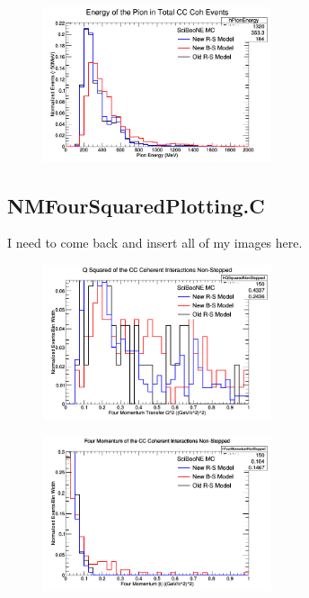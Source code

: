\documentclass[11pt]{article}
\begin{document}
\begin{figure}[H]
\centering
\includegraphics[width=0.6\textwidth]{NMPionPlottingImages/12-NMPionPlotting.png}
\caption{}
\end{figure}

\subsection{NMFourSquaredPlotting.C}
I need to come back and insert all of my images here.

\begin{figure}[H]
\centering
\includegraphics[width=0.6\textwidth]{NMFourSquaredPlottingImages/1-NMFourSquaredPlotting.png}
\caption{}
\end{figure}

\begin{figure}[H]
\centering
\includegraphics[width=0.6\textwidth]{NMFourSquaredPlottingImages/2-NMFourSquaredPlotting.png}
\caption{}
\end{figure}
\end{document}
